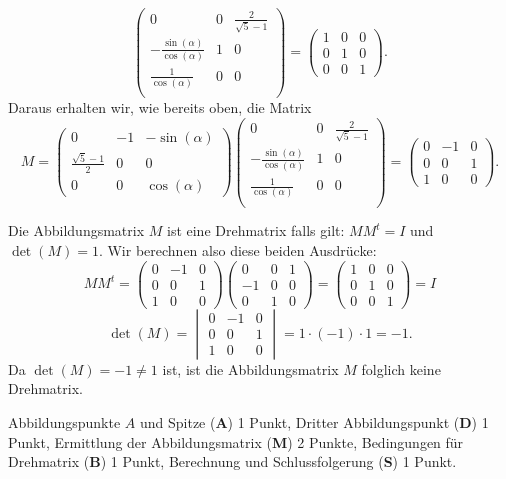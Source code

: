 \begin{loesung}
\begin{teilaufgaben}
\[\begin{pmatrix}
0&0&\frac{2}{\sqrt{5}-1}\\
-\frac{\sin(\alpha)}{\cos(\alpha)}&1&0\\
\frac{1}{\cos(\alpha)}&0&0\\
\end{pmatrix}
=
\begin{pmatrix}
1&0&0\\
0&1&0\\
0&0&1
\end{pmatrix}.
\]
Daraus erhalten wir, wie bereits oben, die Matrix 
\[
M=
\begin{pmatrix}
0                   &-1&-\sin(\alpha)\\
\frac{\sqrt{5}-1}{2}& 0&0\\
0                   & 0&\cos(\alpha)
\end{pmatrix}
\begin{pmatrix}
0&0&\frac{2}{\sqrt{5}-1}\\
-\frac{\sin(\alpha)}{\cos(\alpha)}&1&0\\
\frac{1}{\cos(\alpha)}&0&0\\
\end{pmatrix}
=
\begin{pmatrix}
0&-1&0\\
0&0&1\\
1&0&0
\end{pmatrix}.
\]
\item
Die Abbildungsmatrix $M$ ist eine Drehmatrix falls gilt: $MM^t= I $ und $\det(M) = 1$.
Wir berechnen also diese beiden Ausdrücke:
\[
MM^t = 
\begin{pmatrix}
0&-1&0\\
0&0&1\\
1&0&0
\end{pmatrix}
\begin{pmatrix}
0&0&1\\
-1&0&0\\
0 &1&0
\end{pmatrix}
=
\begin{pmatrix}
1&0&0\\
0&1&0\\
0 &0&1
\end{pmatrix} = I
\]
\[
\det(M) = 
\begin{vmatrix}
0&-1&0\\
0&0&1\\
1&0&0
\end{vmatrix}
= 
1\cdot(-1)\cdot 1 = -1.
\]
Da $\det(M) = -1 \neq 1$ ist, ist die Abbildungsmatrix $M$ folglich keine Drehmatrix.
\qedhere
\end{teilaufgaben}
\end{loesung}

\begin{bewertung}
Abbildungspunkte $A$ und Spitze ({\bf A}) 1 Punkt,
Dritter Abbildungspunkt ({\bf D}) 1 Punkt,
Ermittlung der Abbildungsmatrix ({\bf M}) 2 Punkte,
Bedingungen für Drehmatrix ({\bf B}) 1 Punkt,
Berechnung und Schlussfolgerung ({\bf S}) 1 Punkt.
\end{bewertung}

